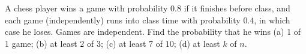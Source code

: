 A chess player wins a game with probability $0.8$ if it finishes before class, and each game (independently) runs into class time with probability $0.4$, in which case he loses. Games are independent. Find the probability that he wins (a) $1$ of $1$ game; (b) at least $2$ of $3$; (c) at least $7$ of $10$; (d) at least $k$ of $n$.
